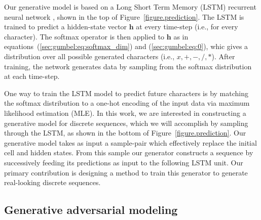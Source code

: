 Our generative model is based on a Long Short Term Memory (LSTM) recurrent neural network \cite{hochreiter1997long}, shown in the top of Figure~\ref{figure.prediction}. The LSTM is trained to predict a hidden-state vector $\mathbf{h}$ at every time-step (i.e., for every character). The softmax operator is then applied to $\mathbf{h}$ as in equations~(\ref{sec:gumbel:eq:softmax_dim}) and (\ref{sec:gumbel:eq:0}), whic gives a distribution over all possible generated characters (i.e., $x,+,-,/,*$). After training, the network generates data by sampling from the softmax distribution at each time-step.

One way to train the LSTM model to predict future characters is by matching the softmax distribution to a one-hot encoding of the input data via maximum likelihood estimation (MLE). In this work, we are interested in constructing a generative model for discrete sequences, which we will accomplish by sampling through the LSTM, as shown in the bottom of Figure~\ref{figure.prediction}. Our generative model takes as input a sample-pair which effectively replace the initial cell and hidden states. From this sample our generator constructs a sequence by successively feeding its predictions as input to the following LSTM unit. Our primary contribution is designing a method to train this generator to generate real-looking discrete sequences.


\subsection*{Generative adversarial modeling}

